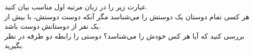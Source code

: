 عبارت زیر را در زبان مرتبه اول مناسب بیان کنید.\\
	هر کسی تمام دوستان یک دوستش را ‌می‌شناسد مگر آنکه دوست دوستش، با بیش از یک نفر از دوستانش دوست باشد.\\
	بررسی کنید که آیا هر کس خودش را می‌شناسد؟ دوستی را رابطه دو طرفه در نظر بگیرید.
